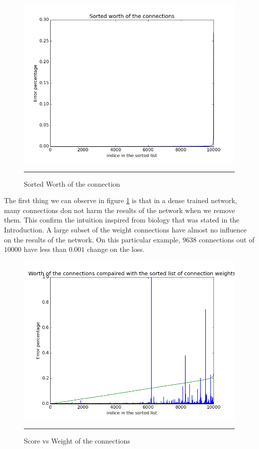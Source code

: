 \begin{figure}[htbp]
    \centering
    \includegraphics[scale=0.5]{Figures/score_worth_connection.png}
    \rule{35em}{0.5pt}
    \caption[Sorted Worth of the Connection]{ Sorted Worth of the connection}
    \label{fig:score_worth_connection}
\end{figure}

The first thing we can observe in figure \ref{fig:score_worth_connection} is that in a dense trained network, many connections don not harm the results of the network when we remove them. This confirm the intuition inspired from biology that was stated in the Introduction. A large subset of the weight connections have almost no influence on the results of the network. On this particular example, $9638$ connections out of $10000$ have less than $0.001$ change on the loss. 


\begin{figure}[htbp]
    \centering
    \includegraphics[scale=0.5]{Figures/score_vs_weight_connections.png}
    \rule{35em}{0.5pt}
    \caption[Score Vs Weigth of the connections]{Score vs Weight of the connections}
    \label{fig:score_vs_weight}
\end{figure}

